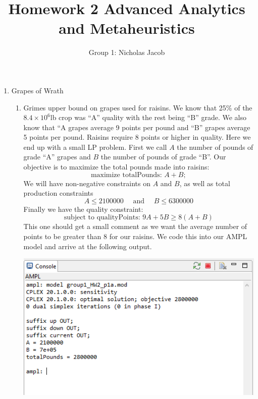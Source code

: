 \documentclass[11pt]{article}
\author{Group 1:  Nicholas Jacob}
\title{Homework 2 Advanced Analytics and Metaheuristics}
\begin{document}
\maketitle
%
\begin{enumerate}
\item Grapes of Wrath
\begin{enumerate}
\item Grimes upper bound on grapes used for raisins.  We know that 25\% of the $8.4\times10^6$lb crop was ``A'' quality with the rest being ``B'' grade.  We also know that ``A grapes average 9 points per pound and ``B'' grapes average 5 points per pound.  Raisins require 8 points or higher in quality.  Here we end up with a small LP problem.  First we call $A$ the number of pounds of grade ``A'' grapes and $B$ the number of pounds of grade ``B''.  Our objective is to maximize the total pounds made into raisins:
\[
\text{maximize totalPounds: }A +B;
\]
We will have non-negative constraints on $A$ and $B$, as well as total production constraints
\[
A\leq 2 100 000\quad\text{ and }\quad B\leq 6 300 000
\]
Finally we have the quality constraint:
\[
\text{subject to qualityPoints: }9A +5B \geq 8\left(A+B\right)
\]
This one should get a small comment as we want the average number of points to be greater than 8 for our raisins.  We code this into our AMPL model and arrive at the following output.


\includegraphics[width = .9\textwidth]{outputp1a.png}


\end{enumerate}
\end{enumerate}
\end{document}
